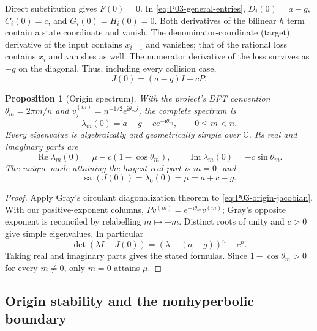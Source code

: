 \documentclass[11pt]{article}
\newcommand{\C}{\mathbb{C}}
\newcommand{\ii}{\mathrm{i}}
\DeclareMathOperator{\sa}{sa}
\DeclareMathOperator{\Ree}{Re}
\DeclareMathOperator{\Imm}{Im}
\newtheorem{proposition}[theorem]{Proposition}
\theoremstyle{definition}
\theoremstyle{remark}
\begin{document}
Direct substitution gives $F(0)=0$. In
\eqref{eq:P03-general-entries}, $D_i(0)=a-g$, $C_i(0)=c$, and
$G_i(0)=H_i(0)=0$. Both derivatives of the bilinear $h$ term
contain a state coordinate and vanish. The denominator-coordinate
(target) derivative of the input contains $x_{i-1}$ and vanishes;
that of the rational loss contains $x_i$ and vanishes as well.
The numerator derivative of the loss survives as $-g$ on the
 diagonal. Thus, including every collision case,
\begin{equation}
 \boxed{J(0)=(a-g)I+cP.}
 \label{eq:P03-origin-jacobian}
\end{equation}

\begin{proposition}[Origin spectrum]
\label{prop:P03-origin-spectrum}
With the project's DFT convention $\theta_m=2\pi m/n$ and
$v^{(m)}_j=n^{-1/2}e^{\ii\theta_m j}$, the complete spectrum is
\begin{equation}
 \boxed{\lambda_m(0)=a-g+c e^{-\ii\theta_m},\qquad 0\le m<n.}
 \label{eq:P03-origin-spectrum}
\end{equation}
Every eigenvalue is algebraically and geometrically simple over $\C$.
Its real and imaginary parts are
\begin{equation}
 \Ree\lambda_m(0)=\mu-c(1-\cos\theta_m),\qquad
 \Imm\lambda_m(0)=-c\sin\theta_m.
 \label{eq:P03-origin-parts}
\end{equation}
The unique mode attaining the largest real part is $m=0$, and
\begin{equation}
 \boxed{\sa(J(0))=\lambda_0(0)=\mu=a+c-g.}
 \label{eq:P03-abscissa}
\end{equation}
\end{proposition}
\begin{proof}
Apply Gray's circulant diagonalization theorem
\cite[Theorem~3.1]{Gray2006} to \eqref{eq:P03-origin-jacobian}.
With our positive-exponent columns, $Pv^{(m)}=e^{-\ii\theta_m}v^{(m)}$;
Gray's opposite exponent is reconciled by relabelling $m\mapsto -m$.
Distinct roots of unity and $c>0$ give simple eigenvalues. In particular
\begin{equation}
 \det(\lambda I-J(0))=(\lambda-(a-g))^n-c^n.
 \label{eq:P03-characteristic}
\end{equation}
Taking real and imaginary parts gives the stated formulas. Since
$1-\cos\theta_m>0$ for every $m\ne0$, only $m=0$ attains $\mu$.
\end{proof}

\subsection{Origin stability and the nonhyperbolic boundary}
\label{slot:P03-2}
\end{document}
